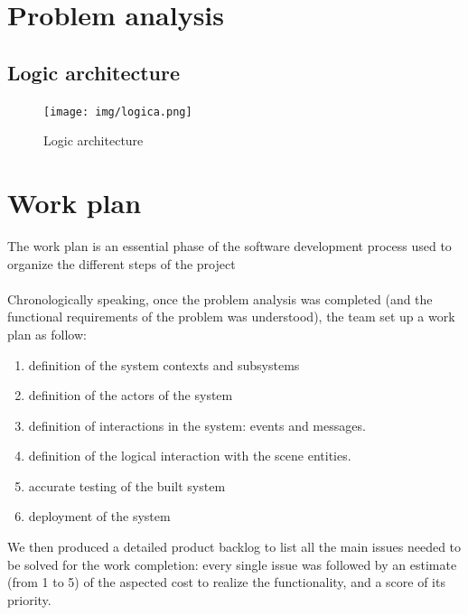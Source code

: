 \documentclass{llncs}
\newcommand{\labelsec}[1]{\label{sec:#1}}
\begin{document}
\section{Problem analysis}
\labelsec{ProblemAnalysis}
\subsection{Logic architecture}
\begin{figure}[htbp]
  \centering
   \texttt{[image: img/logica.png]}
  \caption{Logic architecture}
\end{figure}
\newpage
\newpage
\section{Work plan}
\labelsec{wplan}
The work plan is an essential phase of the software development process used to organize the different steps of the project\\\\
Chronologically speaking, once the problem analysis was completed (and the functional requirements of the problem was understood), the team set up a work plan as follow:
\begin{enumerate}
\item definition of the system contexts and subsystems
\item definition of the actors of the system
\item definition of interactions in the system: events and messages.
\item definition of the logical interaction with the scene entities.
\item accurate testing of the built system
\item deployment of the system
\end{enumerate}
We then produced a detailed product backlog to list all the main issues needed to be solved for the work completion: every single issue was followed by an estimate (from 1 to 5) of the aspected cost to realize the functionality, and a score of its priority.
\end{document}
